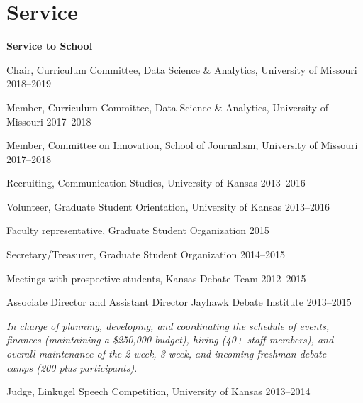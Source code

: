 \section{Service}

\textbf{Service to School}
  \begin{innerlist}
    \item Chair, Curriculum Committee, Data Science \& Analytics, University of Missouri \hfill 2018--2019
    \item Member, Curriculum Committee, Data Science \& Analytics, University of Missouri \hfill 2017--2018
    \item Member, Committee on Innovation, School of Journalism, University of Missouri \hfill 2017--2018
    \item Recruiting, Communication Studies, University of Kansas \hfill 2013--2016
    \item Volunteer, Graduate Student Orientation, University of Kansas \hfill 2013--2016
    \item Faculty representative, Graduate Student Organization \hfill 2015
    \item Secretary/Treasurer, Graduate Student Organization \hfill 2014--2015
    \item Meetings with prospective students, Kansas Debate Team \hfill 2012--2015
    \item Associate Director and Assistant Director Jayhawk Debate Institute \hfill 2013--2015
    \begin{outerlist}
      \item[]\textit{In charge of planning, developing, and coordinating the schedule of events,\\
        finances (maintaining a \$250,000 budget), hiring (40+ staff members), and\\
        overall maintenance of the 2-week, 3-week, and incoming-freshman debate \\
        camps (200 plus participants)}.
    \end{outerlist} \vspace{1em}
    \item Judge, Linkugel Speech Competition, University of Kansas \hfill 2013--2014
    \end{innerlist}\vspace{1em}

